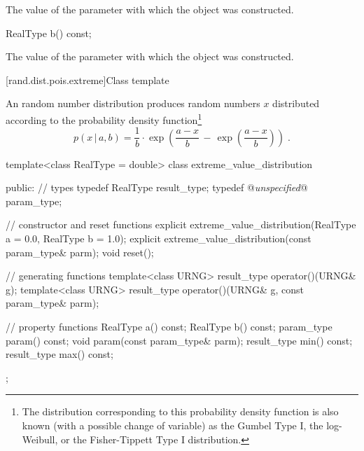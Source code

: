 \begin{itemdescr}
\pnum\returns The value of the  parameter
 with which the object was constructed.
\end{itemdescr}

%
%
\begin{itemdecl}
RealType b() const;
\end{itemdecl}

\begin{itemdescr}
\pnum\returns The value of the  parameter
 with which the object was constructed.
\end{itemdescr}


[rand.dist.pois.extreme]{Class template }

\pnum
An  random number distribution
produces random numbers $x$
distributed according to
the probability density function\footnote{The distribution corresponding to
 this probability density function
 is also known
 (with a possible change of variable)
 as the Gumbel Type I,
 the log-Weibull,
 or the Fisher-Tippett Type I
 distribution.}%
%
\[%
 p(x\,|\,a,b)
      =       \frac{1}{b}
        \cdot \exp\left(  \frac{a-x}{b}
                       \,-\, \exp\left(\frac{a-x}{b}\right)
                  \right)
\; \mbox{.}
\]

\begin{codeblock}
template<class RealType = double>
 class extreme_value_distribution
{
public:
 // types
 typedef RealType result_type;
 typedef @\textit{unspecified}@ param_type;

 // constructor and reset functions
 explicit extreme_value_distribution(RealType a = 0.0, RealType b = 1.0);
 explicit extreme_value_distribution(const param_type& parm);
 void reset();

 // generating functions
 template<class URNG>
   result_type operator()(URNG& g);
 template<class URNG>
   result_type operator()(URNG& g, const param_type& parm);

 // property functions
 RealType a() const;
 RealType b() const;
 param_type param() const;
 void param(const param_type& parm);
 result_type min() const;
 result_type max() const;
};
\end{codeblock}


